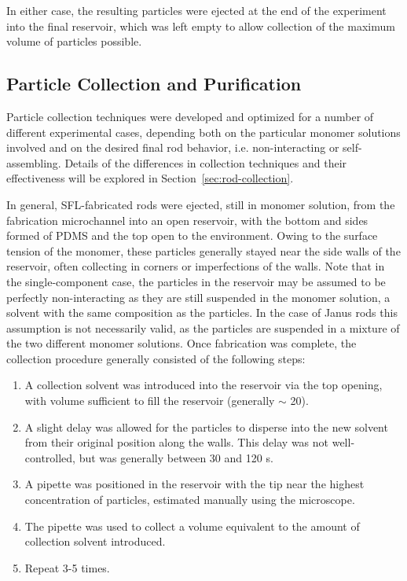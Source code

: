 In either case, the resulting particles were ejected at the end of the experiment into the final reservoir, which
was left empty to allow collection of the maximum volume of particles possible.

\subsection{Particle Collection and Purification}
\label{sec:exp-collection}

Particle collection techniques were developed and optimized for a number of different experimental cases,
depending both on the particular monomer solutions involved and on the desired final rod behavior, i.e. 
non-interacting or self-assembling.  Details of the differences
in collection techniques and their effectiveness will be explored in Section~\ref{sec:rod-collection}.

In general, SFL-fabricated rods were ejected, still in monomer solution, from the fabrication microchannel into 
an open reservoir, with the bottom and sides formed of PDMS and the top open to the environment.  Owing to the
surface tension of the monomer, these particles generally stayed near the side walls of the reservoir, often
collecting in corners or imperfections of the walls.  Note that in the single-component case, the particles in
the reservoir may be assumed to be perfectly non-interacting as they are still suspended in the monomer solution, 
a solvent with the
same composition as the particles.   In the case of Janus rods this assumption is not necessarily valid, as
the particles are suspended in a mixture of the two different monomer solutions.  Once fabrication 
was complete, the collection procedure generally consisted of the following steps:

\begin{enumerate}
\item A collection solvent was introduced into the reservoir via the top opening, with volume sufficient to
fill the reservoir (generally $\sim$ 20\uL).
\item A slight delay was allowed for the particles to disperse into the new solvent from their 
original position along the 
walls. This delay was not well-controlled, but was generally between 30 and 120 s.
\item A pipette was positioned in the reservoir with the tip near the highest concentration of particles, estimated
manually using the microscope.
\item The pipette was used to collect a volume equivalent to the amount of collection solvent introduced.
\item Repeat 3-5 times.
\end{enumerate}

